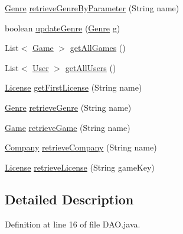 \begin{DoxyCompactItemize}
\item 
\hyperlink{classes_1_1deusto_1_1server_1_1db_1_1data_1_1_genre}{Genre} \hyperlink{classes_1_1deusto_1_1server_1_1db_1_1dao_1_1_d_a_o_a1442de50d193b561a382edcac5837660}{retrieve\+Genre\+By\+Parameter} (String name)
\item 
boolean \hyperlink{classes_1_1deusto_1_1server_1_1db_1_1dao_1_1_d_a_o_ae08384fb32fa6936c93f6292dbe02c7e}{update\+Genre} (\hyperlink{classes_1_1deusto_1_1server_1_1db_1_1data_1_1_genre}{Genre} g)
\item 
List$<$ \hyperlink{classes_1_1deusto_1_1server_1_1db_1_1data_1_1_game}{Game} $>$ \hyperlink{classes_1_1deusto_1_1server_1_1db_1_1dao_1_1_d_a_o_af49ed57bdac4dec48ab7616602d12df2}{get\+All\+Games} ()
\item 
List$<$ \hyperlink{classes_1_1deusto_1_1server_1_1db_1_1data_1_1_user}{User} $>$ \hyperlink{classes_1_1deusto_1_1server_1_1db_1_1dao_1_1_d_a_o_a9c59f6c4bf89f46e305f88a4f8eb96bc}{get\+All\+Users} ()
\item 
\hyperlink{classes_1_1deusto_1_1server_1_1db_1_1data_1_1_license}{License} \hyperlink{classes_1_1deusto_1_1server_1_1db_1_1dao_1_1_d_a_o_a4a5a54059bac00ea6f3b6d21f2a31a02}{get\+First\+License} (String name)
\item 
\hyperlink{classes_1_1deusto_1_1server_1_1db_1_1data_1_1_genre}{Genre} \hyperlink{classes_1_1deusto_1_1server_1_1db_1_1dao_1_1_d_a_o_a16b0af798fbb00cd29a505491c57e2cd}{retrieve\+Genre} (String name)
\item 
\hyperlink{classes_1_1deusto_1_1server_1_1db_1_1data_1_1_game}{Game} \hyperlink{classes_1_1deusto_1_1server_1_1db_1_1dao_1_1_d_a_o_ac94a91d3e5aeeb98fc12f087532b3506}{retrieve\+Game} (String name)
\item 
\hyperlink{classes_1_1deusto_1_1server_1_1db_1_1data_1_1_company}{Company} \hyperlink{classes_1_1deusto_1_1server_1_1db_1_1dao_1_1_d_a_o_aabd374b169473cfd6e1bdc4efc89b177}{retrieve\+Company} (String name)
\item 
\hyperlink{classes_1_1deusto_1_1server_1_1db_1_1data_1_1_license}{License} \hyperlink{classes_1_1deusto_1_1server_1_1db_1_1dao_1_1_d_a_o_a02fd634e6bd7a087b1476ab161af646f}{retrieve\+License} (String game\+Key)
\end{DoxyCompactItemize}


\subsection{Detailed Description}


Definition at line 16 of file D\+A\+O.\+java.



